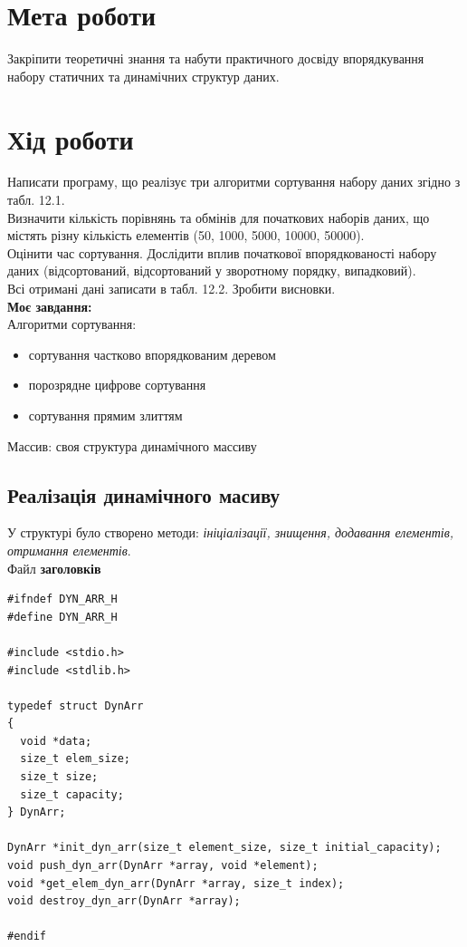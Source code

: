 \section{Мета роботи}
Закріпити теоретичні знання та набути практичного досвіду
впорядкування набору статичних та динамічних структур даних.

\section{Хід роботи}
Написати програму, що реалізує три алгоритми сортування набору
даних згідно з табл. 12.1.\\

Визначити кількість порівнянь та обмінів для початкових наборів
даних, що містять різну кількість елементів (50, 1000, 5000, 10000, 50000).\\

Оцінити час сортування. Дослідити вплив початкової впорядкованості
набору даних (відсортований, відсортований у зворотному порядку,
випадковий).\\

Всі отримані дані записати в табл. 12.2. Зробити висновки.\\

\textbf{Моє завдання:} \\
Алгоритми сортування:
\begin{itemize}
  \item сортування частково впорядкованим деревом
  \item порозрядне цифрове сортування
  \item сортування прямим злиттям
\end{itemize}
Массив: своя структура динамічного массиву\\

\clearpage
\subsection{Реалізація динамічного масиву}
У структурі було створено методи: \textit{ініціалізації, знищення, додавання елементів, отримання елементів}.\\

Файл \textbf{заголовків}
\begin{lstlisting}[style=customc]
#ifndef DYN_ARR_H
#define DYN_ARR_H

#include <stdio.h>
#include <stdlib.h>

typedef struct DynArr
{
  void *data;
  size_t elem_size;
  size_t size;
  size_t capacity;
} DynArr;

DynArr *init_dyn_arr(size_t element_size, size_t initial_capacity);
void push_dyn_arr(DynArr *array, void *element);
void *get_elem_dyn_arr(DynArr *array, size_t index);
void destroy_dyn_arr(DynArr *array);

#endif
\end{lstlisting}

